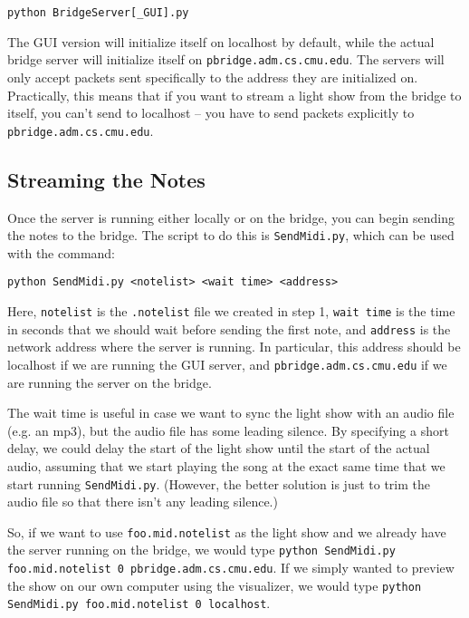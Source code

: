 \documentclass[11pt]{article}
\begin{document}
\begin{center}
\texttt{python BridgeServer[\_GUI].py}
\end{center}

The GUI version will initialize itself on localhost by default, while
the actual bridge server will initialize itself on
\texttt{pbridge.adm.cs.cmu.edu}. The servers will only accept packets
sent specifically to the address they are initialized on. Practically,
this means that if you want to stream a light show from the bridge to
itself, you can't send to localhost -- you have to send packets
explicitly to \texttt{pbridge.adm.cs.cmu.edu}.

\subsection{Streaming the Notes}

Once the server is running either locally or on the bridge, you can
begin sending the notes to the bridge. The script to do this is
\texttt{SendMidi.py}, which can be used with the command:

\begin{center}
\texttt{python SendMidi.py <notelist> <wait time> <address>}
\end{center}

Here, \texttt{notelist} is the \texttt{.notelist} file we created in
step 1, \texttt{wait time} is the time in seconds that we should wait
before sending the first note, and \texttt{address} is the network
address where the server is running. In particular, this address
should be localhost if we are running the GUI server, and
\texttt{pbridge.adm.cs.cmu.edu} if we are running the server on the
bridge.

The wait time is useful in case we want to sync the light show with an
audio file (e.g. an mp3), but the audio file has some leading
silence. By specifying a short delay, we could delay the start of the
light show until the start of the actual audio, assuming that we start
playing the song at the exact same time that we start running
\texttt{SendMidi.py}. (However, the better solution is just to trim
the audio file so that there isn't any leading silence.)

So, if we want to use \texttt{foo.mid.notelist} as the light show and
we already have the server running on the bridge, we would type
\texttt{python SendMidi.py foo.mid.notelist 0
  pbridge.adm.cs.cmu.edu}. If we simply wanted to preview the show on
our own computer using the visualizer, we would type \texttt{python
  SendMidi.py foo.mid.notelist 0 localhost}.
\end{document}
